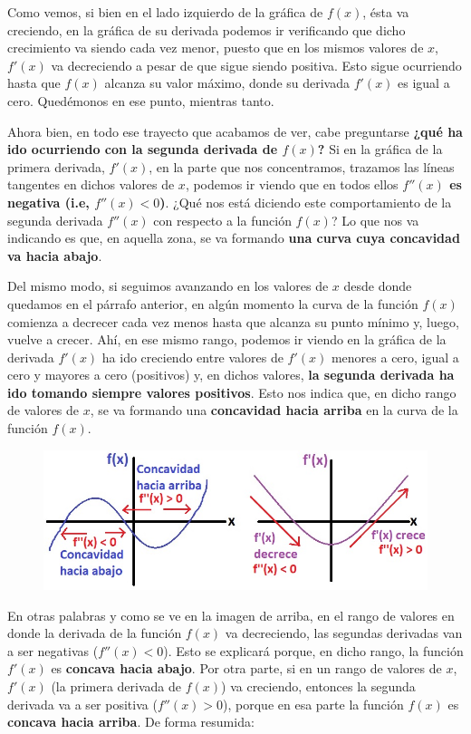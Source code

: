 \documentclass[12pt]{article}
\begin{document}
Como vemos, si bien en el lado izquierdo de la gráfica de $f(x)$, ésta va creciendo, en la gráfica de su derivada podemos ir verificando que dicho crecimiento va siendo cada vez menor, puesto que en los mismos valores de $x$, $f'(x)$ va decreciendo a pesar de que sigue siendo positiva. Esto sigue ocurriendo hasta que $f(x)$ alcanza su valor máximo, donde su derivada $f'(x)$ es igual a cero. Quedémonos en ese punto, mientras tanto.

Ahora bien, en todo ese trayecto que acabamos de ver, cabe preguntarse \textbf{¿qué ha ido ocurriendo con la segunda derivada de $f(x)$?} Si en la gráfica de la primera derivada, $f'(x)$, en la parte que nos concentramos, trazamos las líneas tangentes en dichos valores de $x$, podemos ir viendo que en todos ellos \textbf{$f''(x)$ es negativa (i.e, $f''(x) < 0$)}. ¿Qué nos está diciendo este comportamiento de la segunda derivada $f''(x)$ con respecto a la función $f(x)$? Lo que nos va indicando es que, en aquella zona, se va formando \textbf{una curva cuya concavidad va hacia abajo}.

Del mismo modo, si seguimos avanzando en los valores de $x$ desde donde quedamos en el párrafo anterior, en algún momento la curva de la función $f(x)$ comienza a decrecer cada vez menos hasta que alcanza su punto mínimo y, luego, vuelve a crecer. Ahí, en ese mismo rango, podemos ir viendo en la gráfica de la derivada $f'(x)$ ha ido creciendo entre valores de $f'(x)$ menores a cero, igual a cero y mayores a cero (positivos) y, en dichos valores, \textbf{la segunda derivada ha ido tomando siempre valores positivos}. Esto nos indica que, en dicho rango de valores de $x$, se va formando una \textbf{concavidad hacia arriba} en la curva de la función $f(x)$.

\begin{figure}[hbt!]
\centering
\includegraphics[scale=0.6]{img/concavity_2.jpg}
\end{figure}

En otras palabras y como se ve en la imagen de arriba, en el rango de valores en donde la derivada de la función $f(x)$ va decreciendo, las segundas derivadas van a ser negativas ($f''(x) < 0$). Esto se explicará porque, en dicho rango, la función $f'(x)$ es \textbf{concava hacia abajo}. Por otra parte, si en un rango de valores de $x$, $f'(x)$ (la primera derivada de $f(x)$) va creciendo, entonces la segunda derivada va a ser positiva ($f''(x) > 0$), porque en esa parte la función $f(x)$ es \textbf{concava hacia arriba}. De forma resumida:
\end{document}
